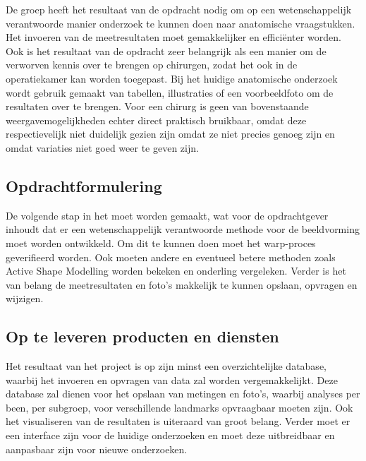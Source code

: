 De \casamproject groep heeft het resultaat van de opdracht nodig om op een wetenschappelijk verantwoorde manier onderzoek te kunnen doen naar anatomische vraagstukken. 
Het invoeren van de meetresultaten moet gemakkelijker en effici\"enter worden. 
Ook is het resultaat van de opdracht zeer belangrijk als een manier om de verworven kennis over te brengen op chirurgen, zodat het ook in de operatiekamer kan worden toegepast. 
Bij het huidige anatomische onderzoek wordt gebruik gemaakt van tabellen, illustraties of een voorbeeldfoto om de resultaten over te brengen.
Voor een chirurg is geen van bovenstaande weergavemogelijkheden echter direct praktisch bruikbaar, omdat deze respectievelijk niet duidelijk gezien zijn omdat ze niet precies genoeg zijn en omdat variaties niet goed weer te geven zijn.



\subsection{Opdrachtformulering}

De volgende stap in het \casamproject moet worden gemaakt, wat voor de opdrachtgever inhoudt dat er een wetenschappelijk verantwoorde methode voor de beeldvorming moet worden ontwikkeld. 
Om dit te kunnen doen moet het warp-proces geverifieerd worden. 
Ook moeten andere en eventueel betere methoden zoals Active Shape Modelling worden bekeken en onderling vergeleken. 
Verder is het van belang de meetresultaten en foto's makkelijk te kunnen opslaan, opvragen en wijzigen. 


\subsection{Op te leveren producten en diensten}

Het resultaat van het project is op zijn minst een overzichtelijke database, waarbij het invoeren en opvragen van data zal worden vergemakkelijkt.
Deze database zal dienen voor het opslaan van metingen en foto's, waarbij analyses per been, per subgroep, voor verschillende landmarks opvraagbaar moeten zijn.
Ook het visualiseren van de resultaten is uiteraard van groot belang.
Verder moet er een interface zijn voor de huidige onderzoeken en moet deze uitbreidbaar en aanpasbaar zijn voor nieuwe onderzoeken. 

